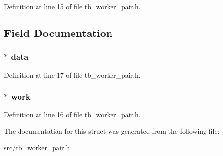 Definition at line 15 of file tb\-\_\-worker\-\_\-pair.\-h.



\subsection{Field Documentation}
\hypertarget{structtb__worker__pair__t_a1c1dc2e9642e013fcac80a215230478a}{
\subsubsection[{data}]{$\ast$ data}}\label{structtb__worker__pair__t_a1c1dc2e9642e013fcac80a215230478a}


Definition at line 17 of file tb\-\_\-worker\-\_\-pair.\-h.

\hypertarget{structtb__worker__pair__t_a251992dcf5d5af0421eb260017a00b2a}{
\subsubsection[{work}]{$\ast$ work}}\label{structtb__worker__pair__t_a251992dcf5d5af0421eb260017a00b2a}


Definition at line 16 of file tb\-\_\-worker\-\_\-pair.\-h.



The documentation for this struct was generated from the following file\-:\begin{DoxyCompactItemize}
\item 
src/\hyperlink{tb__worker__pair_8h}{tb\-\_\-worker\-\_\-pair.\-h}\end{DoxyCompactItemize}
